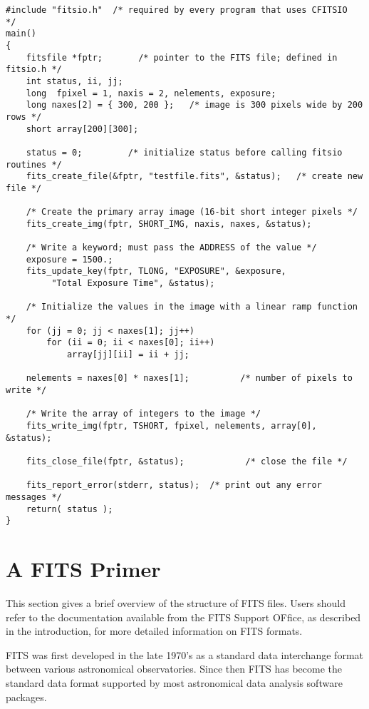 \documentclass[11pt]{book}
\begin{document}
\begin{verbatim}
#include "fitsio.h"  /* required by every program that uses CFITSIO  */
main()
{
    fitsfile *fptr;       /* pointer to the FITS file; defined in fitsio.h */
    int status, ii, jj;
    long  fpixel = 1, naxis = 2, nelements, exposure;
    long naxes[2] = { 300, 200 };   /* image is 300 pixels wide by 200 rows */
    short array[200][300];

    status = 0;         /* initialize status before calling fitsio routines */
    fits_create_file(&fptr, "testfile.fits", &status);   /* create new file */

    /* Create the primary array image (16-bit short integer pixels */
    fits_create_img(fptr, SHORT_IMG, naxis, naxes, &status);

    /* Write a keyword; must pass the ADDRESS of the value */
    exposure = 1500.;
    fits_update_key(fptr, TLONG, "EXPOSURE", &exposure,
         "Total Exposure Time", &status);

    /* Initialize the values in the image with a linear ramp function */
    for (jj = 0; jj < naxes[1]; jj++)
        for (ii = 0; ii < naxes[0]; ii++)
            array[jj][ii] = ii + jj;

    nelements = naxes[0] * naxes[1];          /* number of pixels to write */

    /* Write the array of integers to the image */
    fits_write_img(fptr, TSHORT, fpixel, nelements, array[0], &status);

    fits_close_file(fptr, &status);            /* close the file */

    fits_report_error(stderr, status);  /* print out any error messages */
    return( status );
}
\end{verbatim}

\chapter{  A FITS Primer }

This section gives a brief overview of the structure of FITS files.
Users should refer to the documentation available from the FITS Support OFfice,
as described in the introduction, for more detailed information on FITS
formats.

FITS was first developed in the late 1970's as a standard data
interchange format between various astronomical observatories.  Since
then FITS has become the standard data format supported by most
astronomical data analysis software packages.
\end{document}
